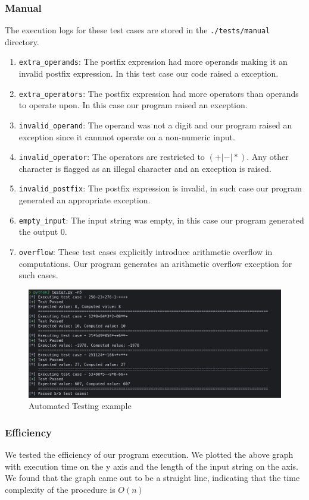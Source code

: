 \documentclass[hidelinks,12pt]{article}
\begin{document}
\subsubsection{Manual}
The execution logs for these test cases are stored in the \verb|./tests/manual| directory.
\begin{enumerate}
    \item \verb|extra_operands|: The postfix expression had more operands making it an invalid postfix expression. In this test case our code raised a exception.
    \item \verb|extra_operators|: The postfix expression had more operators than operands to operate upon. In this case our program raised an exception.
    \item \verb|invalid_operand|: The operand was not a digit and our program raised an exception since it cannnot operate on a non-numeric input.
    \item \verb|invalid_operator|: The operators are restricted to $(+|-|*)$. Any other character is flagged as an illegal character and an exception is raised.
    \item \verb|invalid_postfix|: The postfix expression is invalid, in such case our program generated an appropriate exception.
    \item \verb|empty_input|: The input string was empty, in this case our program generated the output $0$.
    \item \verb|overflow|: These test cases explicitly introduce arithmetic overflow in computations. Our program generates an arithmetic overflow exception for such cases.
\end{enumerate}
\begin{figure}[h!]
    \includegraphics[width=\linewidth]{logs.png}
    \caption{Automated Testing example}
    \label{fig:boat1}
\end{figure}

\subsubsection{Efficiency}
We tested the efficiency of our program execution. We plotted the above graph with execution time on the y axis and the length of the input string on the axis.
We found that the graph came out to be a straight line, indicating that the time complexity of the procedure is $O(n)$
\end{document}
